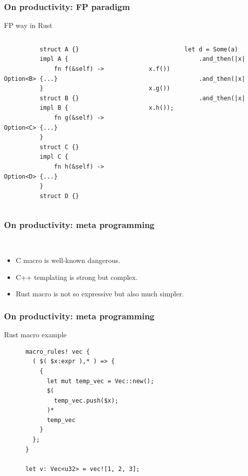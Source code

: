 \documentclass[lualatex,utf8]{beamer}
\begin{document}
\begin{frame}[fragile]
  \frametitle{On productivity: FP paradigm}
  \begin{block}{FP way in Rust}
    \begin{columns}
      \begin{column}[t]{.45\textwidth}
        \begin{verbatim}
          struct A {}
          impl A {
              fn f(&self) -> Option<B> {...}
          }
          struct B {}
          impl B {
              fn g(&self) -> Option<C> {...}
          }
          struct C {}
          impl C {
              fn h(&self) -> Option<D> {...}
          }
          struct D {}
        \end{verbatim}
      \end{column}
      \begin{column}[t]{.45\textwidth}
        \begin{verbatim}
          let d = Some(a)
              .and_then(|x| x.f())
              .and_then(|x| x.g())
              .and_then(|x| x.h());
        \end{verbatim}
      \end{column}
    \end{columns}
  \end{block}
\end{frame}

\begin{frame}
  \frametitle{On productivity: meta programming}
  \begin{block}{~}
    \begin{itemize}
    \item C macro is well-known dangerous.
    \item C++ templating is strong but complex.
    \item Rust macro is not so expressive but also much simpler.
    \end{itemize}
  \end{block}
\end{frame}

\begin{frame}[fragile]
  \frametitle{On productivity: meta programming}
  \begin{block}{Rust macro example}
    \begin{verbatim}
      macro_rules! vec {
        ( $( $x:expr ),* ) => {
          {
            let mut temp_vec = Vec::new();
            $(
              temp_vec.push($x);
            )*
            temp_vec
          }
        };
      }

      let v: Vec<u32> = vec![1, 2, 3];
    \end{verbatim}
  \end{block}
\end{frame}
\end{document}
